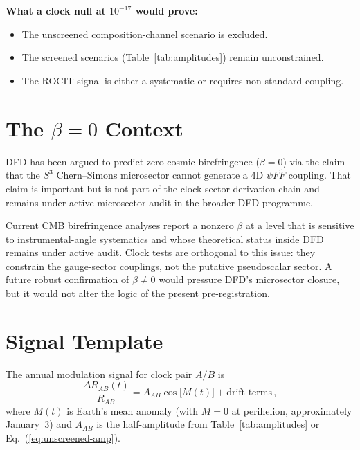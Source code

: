 \documentclass[twocolumn,showpacs,preprintnumbers,amsmath,amssymb,prd]{revtex4-2}
\begin{document}
\textbf{What a clock null at $10^{-17}$ would prove:}
\begin{itemize}
\item The unscreened composition-channel scenario is excluded.
\item The screened scenarios (Table~\ref{tab:amplitudes}) remain
  unconstrained.
\item The ROCIT signal is either a systematic or requires
  non-standard coupling.
\end{itemize}

\section{The $\beta = 0$ Context}\label{sec:beta}

DFD has been argued to predict zero cosmic birefringence
($\beta = 0$) via the claim that the $S^3$ Chern--Simons
microsector cannot generate a 4D $\psi F\tilde{F}$ coupling.
That claim is important but is not part of the clock-sector
derivation chain and remains under active microsector audit in the
broader DFD programme.

Current CMB birefringence analyses report a nonzero $\beta$ at a
level that is sensitive to instrumental-angle systematics and whose
theoretical status inside DFD remains under active audit.  Clock
tests are orthogonal to this issue: they constrain the gauge-sector
couplings, not the putative pseudoscalar sector.  A future robust
confirmation of $\beta \neq 0$ would pressure DFD's microsector
closure, but it would not alter the logic of the present
pre-registration.

\section{Signal Template}\label{sec:template}

The annual modulation signal for clock pair $A/B$ is
\begin{equation}\label{eq:template}
\frac{\Delta R_{AB}(t)}{R_{AB}}
= A_{AB}\cos\!\bigl[M(t)\bigr] + \text{drift terms}\,,
\end{equation}
where $M(t)$ is Earth's mean anomaly (with $M = 0$ at perihelion,
approximately January~3) and $A_{AB}$ is the half-amplitude from
Table~\ref{tab:amplitudes} or Eq.~(\ref{eq:unscreened-amp}).
\end{document}
